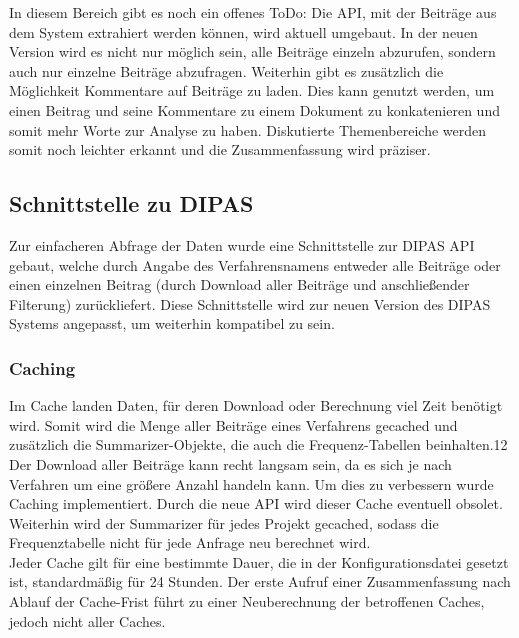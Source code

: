 \documentclass[10pt,a4paper]{article}
\begin{document}
In diesem Bereich gibt es noch ein offenes ToDo: Die API, mit der Beiträge aus dem System extrahiert werden können, wird aktuell umgebaut. In der neuen Version wird es nicht nur möglich sein, alle Beiträge einzeln abzurufen, sondern auch nur einzelne Beiträge abzufragen. Weiterhin gibt es zusätzlich die Möglichkeit Kommentare auf Beiträge zu laden. Dies kann genutzt werden, um einen Beitrag und seine Kommentare zu einem Dokument zu konkatenieren und somit mehr Worte zur Analyse zu haben. Diskutierte Themenbereiche werden somit noch leichter erkannt und die Zusammenfassung wird präziser.

\subsection{Schnittstelle zu DIPAS}
Zur einfacheren Abfrage der Daten wurde eine Schnittstelle zur DIPAS API gebaut, welche durch Angabe des Verfahrensnamens entweder alle Beiträge oder einen einzelnen Beitrag (durch Download aller Beiträge und anschließender Filterung) zurückliefert. Diese Schnittstelle wird zur neuen Version des DIPAS Systems angepasst, um weiterhin kompatibel zu sein.\\


\subsubsection{Caching}
Im Cache landen Daten, für deren Download oder Berechnung viel Zeit benötigt wird. Somit wird die Menge aller Beiträge eines Verfahrens gecached und zusätzlich die Summarizer-Objekte, die auch die Frequenz-Tabellen beinhalten.12
Der Download aller Beiträge kann recht langsam sein, da es sich je nach Verfahren um eine größere Anzahl handeln kann. Um dies zu verbessern wurde Caching implementiert. Durch die neue API wird dieser Cache eventuell obsolet.\\
Weiterhin wird der Summarizer für jedes Projekt gecached, sodass die Frequenztabelle nicht für jede Anfrage neu berechnet wird.\\
Jeder Cache gilt für eine bestimmte Dauer, die in der Konfigurationsdatei gesetzt ist, standardmäßig für 24 Stunden. Der erste Aufruf einer Zusammenfassung nach Ablauf der Cache-Frist führt zu einer Neuberechnung der betroffenen Caches, jedoch nicht aller Caches.
\end{document}
